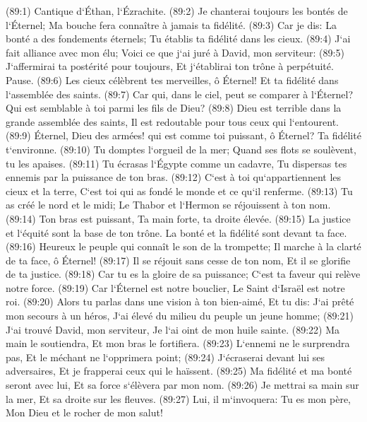 \verse (89:1) Cantique d`Éthan, l`Ézrachite. (89:2) Je chanterai toujours les bontés de l`Éternel; Ma bouche fera connaître à jamais ta fidélité. 
\verse (89:3) Car je dis: La bonté a des fondements éternels; Tu établis ta fidélité dans les cieux. 
\verse (89:4) J`ai fait alliance avec mon élu; Voici ce que j`ai juré à David, mon serviteur: 
\verse (89:5) J`affermirai ta postérité pour toujours, Et j`établirai ton trône à perpétuité. Pause. 
\verse (89:6) Les cieux célèbrent tes merveilles, ô Éternel! Et ta fidélité dans l`assemblée des saints. 
\verse (89:7) Car qui, dans le ciel, peut se comparer à l`Éternel? Qui est semblable à toi parmi les fils de Dieu? 
\verse (89:8) Dieu est terrible dans la grande assemblée des saints, Il est redoutable pour tous ceux qui l`entourent. 
\verse (89:9) Éternel, Dieu des armées! qui est comme toi puissant, ô Éternel? Ta fidélité t`environne. 
\verse (89:10) Tu domptes l`orgueil de la mer; Quand ses flots se soulèvent, tu les apaises. 
\verse (89:11) Tu écrasas l`Égypte comme un cadavre, Tu dispersas tes ennemis par la puissance de ton bras. 
\verse (89:12) C`est à toi qu`appartiennent les cieux et la terre, C`est toi qui as fondé le monde et ce qu`il renferme. 
\verse (89:13) Tu as créé le nord et le midi; Le Thabor et l`Hermon se réjouissent à ton nom. 
\verse (89:14) Ton bras est puissant, Ta main forte, ta droite élevée. 
\verse (89:15) La justice et l`équité sont la base de ton trône. La bonté et la fidélité sont devant ta face. 
\verse (89:16) Heureux le peuple qui connaît le son de la trompette; Il marche à la clarté de ta face, ô Éternel! 
\verse (89:17) Il se réjouit sans cesse de ton nom, Et il se glorifie de ta justice. 
\verse (89:18) Car tu es la gloire de sa puissance; C`est ta faveur qui relève notre force. 
\verse (89:19) Car l`Éternel est notre bouclier, Le Saint d`Israël est notre roi. 
\verse (89:20) Alors tu parlas dans une vision à ton bien-aimé, Et tu dis: J`ai prêté mon secours à un héros, J`ai élevé du milieu du peuple un jeune homme; 
\verse (89:21) J`ai trouvé David, mon serviteur, Je l`ai oint de mon huile sainte. 
\verse (89:22) Ma main le soutiendra, Et mon bras le fortifiera. 
\verse (89:23) L`ennemi ne le surprendra pas, Et le méchant ne l`opprimera point; 
\verse (89:24) J`écraserai devant lui ses adversaires, Et je frapperai ceux qui le haïssent. 
\verse (89:25) Ma fidélité et ma bonté seront avec lui, Et sa force s`élèvera par mon nom. 
\verse (89:26) Je mettrai sa main sur la mer, Et sa droite sur les fleuves. 
\verse (89:27) Lui, il m`invoquera: Tu es mon père, Mon Dieu et le rocher de mon salut! 
